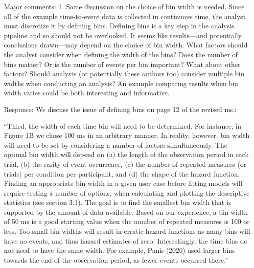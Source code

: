 \documentclass[
]{article}
\renewenvironment{quote}{\begin{leftbar}}{\end{leftbar}}
\begin{document}
\begin{quote}
Major comments: 1. Some discussion on the choice of bin width is needed.
Since all of the example time-to-event data is collected in continuous
time, the analyst must discretize it by defining bins. Defining bins is
a key step in the analysis pipeline and so should not be overlooked. It
seems like results---and potentially conclusions drawn---may depend on
the choice of bin width. What factors should the analyst consider when
defining the width of the bins? Does the number of bins matter? Or is
the number of events per bin important? What about other factors? Should
analysts (or potentially these authors too) consider multiple bin widths
when conducting an analysis? An example comparing results when bin width
varies could be both interesting and informative.
\end{quote}

Response: We discuss the issue of defining bins on page 12 of the
revised ms.:

``Third, the width of each time bin will need to be determined. For
instance, in Figure 1B we chose 100 ms in an arbitrary manner. In
reality, however, bin width will need to be set by considering a number
of factors simultaneously. The optimal bin width will depend on (a) the
length of the observation period in each trial, (b) the rarity of event
occurrence, (c) the number of repeated measures (or trials) per
condition per participant, and (d) the shape of the hazard function.
Finding an appropriate bin width in a given user case before fitting
models will require testing a number of options, when calculating and
plotting the descriptive statistics (see section 3.1). The goal is to
find the smallest bin width that is supported by the amount of data
available. Based on our experience, a bin width of 50 ms is a good
starting value when the number of repeated measures is 100 or less. Too
small bin widths will result in erratic hazard functions as many bins
will have no events, and thus hazard estimates of zero. Interestingly,
the time bins do not need to have the same width. For example, Panis
(2020) used larger bins towards the end of the observation period, as
fewer events occurred there.''
\end{document}
